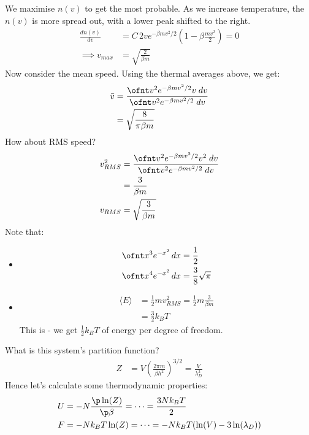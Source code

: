 \documentclass[a4paper, 11pt, normalem]{report}
\begin{document}
\begin{example}
    We maximise $n(v)$ to get the most probable.
    As we increase temperature, the $n(v)$ is more spread out, with a lower peak shifted to the right.
    \begin{align}
        \frac{dn(v)}{dv} &= C\,2ve^{-\beta mv^2/2}\left(1 - \beta \frac{mv^2}{2}\right) = 0 \\
        \implies v_{max} &= \sqrt{\frac{2}{\beta m}}
    \end{align}
    Now consider the mean speed. 
    Using the thermal averages above, we get:
    \begin{align}
        \bar{v} &= \frac{\ofnt v^2e^{-\beta mv^2/2}v\;dv}{\ofnt v^2e^{-\beta mv^2/2}\;dv} \\
                &= \sqrt{\frac{8}{\pi\beta m}}
    \end{align}
    How about RMS speed?
    \begin{align}
        v^2_{RMS} &= \frac{\ofnt v^2e^{-\beta mv^2/2}v^2\;dv}{\ofnt v^2e^{-\beta mv^2/2}\;dv} \\
                  &= \frac{3}{\beta m} \\
        v_{RMS} &= \sqrt{\frac{3}{\beta m}}
    \end{align}
    Note that:
    \begin{itemize}
        \item 
            \begin{align}
                \ofnt x^3e^{-x^2}\,dx &= \frac{1}{2} \\
                \ofnt x^4e^{-x^2}\,dx &= \frac{3}{8}\sqrt{\pi}
            \end{align}
        \item 
            \begin{align}
                \langle E\rangle &= \frac{1}{2}mv^2_{RMS} = \frac{1}{2}m\frac{3}{\beta m} \\
                                 &= \frac{3}{2}k_BT
            \end{align}
            This is  - we get $\frac{1}{2}k_BT$ of energy per degree of freedom.
    \end{itemize}
    What is this system's partition function?
    \begin{align}
        Z &= V\left(\frac{2\pi m}{\beta h^2}\right)^{3/2} = \frac{V}{\lambda_D^3}
    \end{align}
    Hence let's calculate some thermodynamic properties:
    \begin{align}
        U &= -N\frac{\p\ln(Z)}{\p\beta} = \cdots = \frac{3Nk_BT}{2} \\
        F &= -Nk_BT \ln(Z) = \cdots = -Nk_BT(\ln(V) - 3\ln(\lambda_D))
    \end{align}
\end{example}
\end{document}
